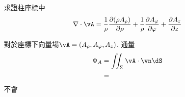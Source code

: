 
\begin{problem}
求證柱座標中
$$\nabla \cdot \vA = \frac{1}{\rho}\frac{\partial(\rho A_\rho)}{\partial \rho} + \frac{1}{\rho}\frac{\partial A_\varphi}{\partial \varphi} + \frac{\partial A_z}{\partial z}$$
\end{problem}

\begin{solve}
    對於座標下向量場$\vA = (A_\rho, A_\varphi, A_z)$,
    通量
    \begin{align}
        \Phi_A & = \iint_\Sigma \vA \cdot \vn \dS \\
               & =
    \end{align}
    不會
\end{solve}